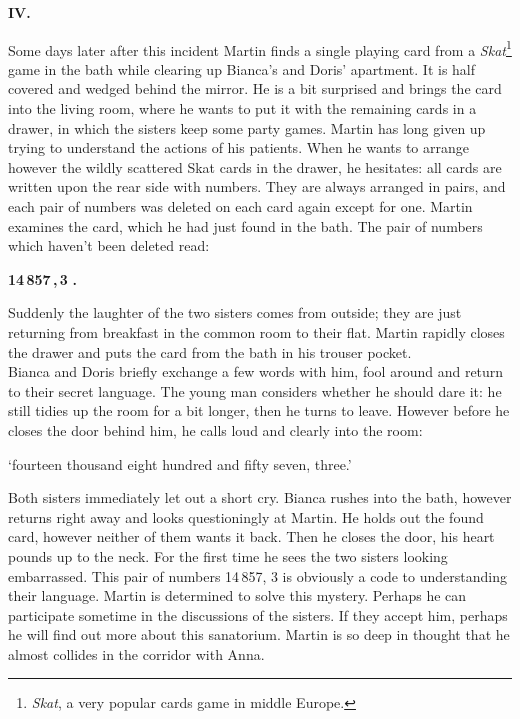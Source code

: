 \begin{center} 
{\bf IV.} 
\end{center} 
Some days later after this incident Martin finds a single playing card from a 
{\em Skat\/}\footnote {{\em Skat\/}, a very popular cards game in middle Europe.} 
game in the bath while clearing up Bianca's and Doris' apartment. 
It is half covered and wedged behind the mirror. 
He is a bit surprised and brings the card into the living room, where he wants to 
put it with the remaining cards in a drawer, in which the sisters keep some party games. 
Martin has long given up trying to understand the actions of his patients. 
When he wants to arrange however the wildly scattered Skat cards in the drawer, he 
hesitates: all cards are written upon the rear side with numbers. 
They are always arranged in pairs, and each pair of numbers was deleted on each card 
again except for one. 
Martin examines the card, which he had just found in the bath. 
The pair of numbers which haven't been deleted read:
\begin{center} 
{\bf 14\,857\,,\,3\,\,.} 
\end{center} 
Suddenly the laughter of the two sisters comes from outside; they are just returning 
from breakfast in the common room to their flat. 
Martin rapidly closes the drawer and puts the card from the bath in his trouser 
pocket. \\
Bianca and Doris briefly exchange a few words with him, fool around and return to 
their secret language. 
The young man considers whether he should dare it: he still tidies up the room for 
a bit longer, then he turns to leave. 
However before he closes the door behind him, he calls loud and clearly into the 
room: 
\begin{center} 
`fourteen thousand eight hundred and fifty seven, three.' 
\end{center} 
Both sisters immediately let out a short cry. 
Bianca rushes into the bath, however returns right away and looks questioningly at 
Martin. 
He holds out the found card, however neither of them wants it back. 
Then he closes the door, his heart pounds up to the neck. 
For the first time he sees the two sisters looking embarrassed. 
This pair of numbers 14\,857,\,\,3 is obviously a code to understanding their language. 
Martin is determined to solve this mystery. 
Perhaps he can participate sometime in the discussions of the sisters. 
If they accept him, perhaps he will find out more about this sanatorium.
Martin is so deep in thought that he almost collides in the corridor with Anna. 
